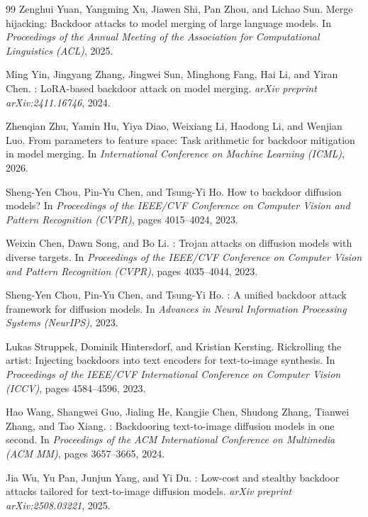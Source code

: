 \documentclass[10pt,twocolumn,letterpaper]{article}
\begin{document}
\begin{thebibliography}{99}
Zenghui Yuan, Yangming Xu, Jiawen Shi, Pan Zhou, and Lichao Sun.
\newblock Merge hijacking: Backdoor attacks to model merging of large language models.
\newblock In \emph{Proceedings of the Annual Meeting of the Association for Computational Linguistics (ACL)}, 2025.

Ming Yin, Jingyang Zhang, Jingwei Sun, Minghong Fang, Hai Li, and Yiran Chen.
: {LoRA}-based backdoor attack on model merging.
\newblock \emph{arXiv preprint arXiv:2411.16746}, 2024.

Zhenqian Zhu, Yamin Hu, Yiya Diao, Weixiang Li, Haodong Li, and Wenjian Luo.
\newblock From parameters to feature space: Task arithmetic for backdoor mitigation in model merging.
\newblock In \emph{International Conference on Machine Learning (ICML)}, 2026.

Sheng-Yen Chou, Pin-Yu Chen, and Tsung-Yi Ho.
\newblock How to backdoor diffusion models?
\newblock In \emph{Proceedings of the IEEE/CVF Conference on Computer Vision and Pattern Recognition (CVPR)}, pages 4015--4024, 2023.

Weixin Chen, Dawn Song, and Bo Li.
: Trojan attacks on diffusion models with diverse targets.
\newblock In \emph{Proceedings of the IEEE/CVF Conference on Computer Vision and Pattern Recognition (CVPR)}, pages 4035--4044, 2023.

Sheng-Yen Chou, Pin-Yu Chen, and Tsung-Yi Ho.
: A unified backdoor attack framework for diffusion models.
\newblock In \emph{Advances in Neural Information Processing Systems (NeurIPS)}, 2023.

Lukas Struppek, Dominik Hintersdorf, and Kristian Kersting.
\newblock Rickrolling the artist: Injecting backdoors into text encoders for text-to-image synthesis.
\newblock In \emph{Proceedings of the IEEE/CVF International Conference on Computer Vision (ICCV)}, pages 4584--4596, 2023.

Hao Wang, Shangwei Guo, Jialing He, Kangjie Chen, Shudong Zhang, Tianwei Zhang, and Tao Xiang.
: Backdooring text-to-image diffusion models in one second.
\newblock In \emph{Proceedings of the ACM International Conference on Multimedia (ACM MM)}, pages 3657--3665, 2024.

Jia Wu, Yu Pan, Junjun Yang, and Yi Du.
: Low-cost and stealthy backdoor attacks tailored for text-to-image diffusion models.
\newblock \emph{arXiv preprint arXiv:2508.03221}, 2025.


\end{thebibliography}
\end{document}
